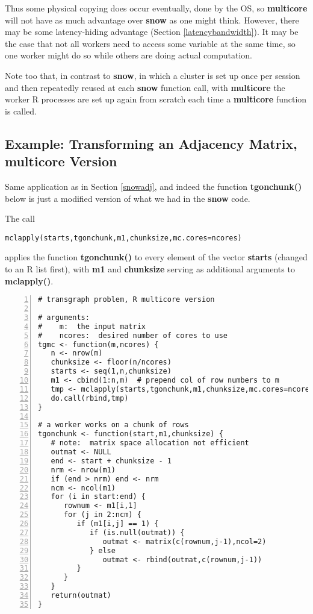 Thus some physical copying does occur eventually, done by the OS, so
{\bf multicore} will not have as much advantage over {\bf snow} as one
might think.  However, there may be some latency-hiding advantage
(Section \ref{latencybandwidth}).  It may be the case that not all
workers need to access some variable at the same time, so one worker
might do so while others are doing actual computation.  

Note too that, in contrast to {\bf snow}, in which a cluster is set up
once per session and then repeatedly reused at each {\bf snow} function
call, with {\bf multicore} the worker R processes are set up again from
scratch each time a {\bf multicore} function is called.

\subsection{Example:  Transforming an Adjacency Matrix, multicore
Version}

Same application as in Section \ref{snowadj}, and indeed the function
{\bf tgonchunk()} below is just a modified version of what we had in the
{\bf snow} code.

The call

\begin{lstlisting}
mclapply(starts,tgonchunk,m1,chunksize,mc.cores=ncores)
\end{lstlisting}

applies the function {\bf tgonchunk()} to every element of the vector
{\bf starts} (changed to an R list first), with {\bf m1} and {\bf
chunksize} serving as additional arguments to {\bf mclapply()}.

\begin{lstlisting}[numbers=left]
# transgraph problem, R multicore version

# arguments:
#    m:  the input matrix 
#    ncores:  desired number of cores to use
tgmc <- function(m,ncores) {
   n <- nrow(m)
   chunksize <- floor(n/ncores)
   starts <- seq(1,n,chunksize)
   m1 <- cbind(1:n,m)  # prepend col of row numbers to m
   tmp <- mclapply(starts,tgonchunk,m1,chunksize,mc.cores=ncores)
   do.call(rbind,tmp)
}

# a worker works on a chunk of rows
tgonchunk <- function(start,m1,chunksize) {
   # note:  matrix space allocation not efficient
   outmat <- NULL
   end <- start + chunksize - 1
   nrm <- nrow(m1)
   if (end > nrm) end <- nrm
   ncm <- ncol(m1)
   for (i in start:end) {
      rownum <- m1[i,1]
      for (j in 2:ncm) {
         if (m1[i,j] == 1) {
            if (is.null(outmat)) {
               outmat <- matrix(c(rownum,j-1),ncol=2)
            } else
               outmat <- rbind(outmat,c(rownum,j-1))
         }
      }
   }
   return(outmat)
}
\end{lstlisting}


